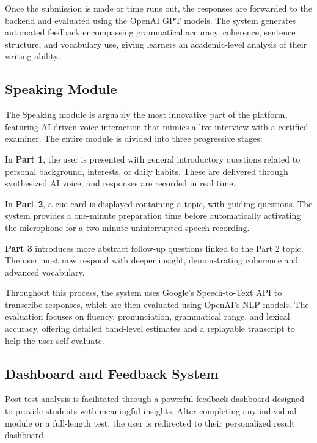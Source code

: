 \documentclass[a4paper,12pt]{article}
\begin{document}
Once the submission is made or time runs out, the responses are forwarded to the backend and evaluated using the OpenAI GPT models. The system generates automated feedback encompassing grammatical accuracy, coherence, sentence structure, and vocabulary use, giving learners an academic-level analysis of their writing ability.

\vspace{0.4cm}
\subsection{Speaking Module}

The Speaking module is arguably the most innovative part of the platform, featuring AI-driven voice interaction that mimics a live interview with a certified examiner. The entire module is divided into three progressive stages:

In \textbf{Part 1}, the user is presented with general introductory questions related to personal background, interests, or daily habits. These are delivered through synthesized AI voice, and responses are recorded in real time.

In \textbf{Part 2}, a cue card is displayed containing a topic, with guiding questions. The system provides a one-minute preparation time before automatically activating the microphone for a two-minute uninterrupted speech recording.

\textbf{Part 3} introduces more abstract follow-up questions linked to the Part 2 topic. The user must now respond with deeper insight, demonstrating coherence and advanced vocabulary.

Throughout this process, the system uses Google’s Speech-to-Text API to transcribe responses, which are then evaluated using OpenAI’s NLP models. The evaluation focuses on fluency, pronunciation, grammatical range, and lexical accuracy, offering detailed band-level estimates and a replayable transcript to help the user self-evaluate.

\vspace{0.4cm}
\subsection{Dashboard and Feedback System}

Post-test analysis is facilitated through a powerful feedback dashboard designed to provide students with meaningful insights. After completing any individual module or a full-length test, the user is redirected to their personalized result dashboard.
\end{document}
